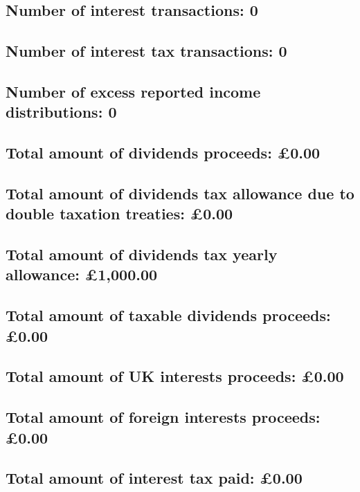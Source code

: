 \documentclass{article}
\begin{document}
\subsection*{Number of interest transactions: 0}
\subsection*{Number of interest tax transactions: 0}
\subsection*{Number of excess reported income distributions: 0}
\subsection*{Total amount of dividends proceeds: £0.00}
\subsection*{Total amount of dividends tax allowance due to double taxation treaties: £0.00}
\subsection*{Total amount of dividends tax yearly allowance: £1,000.00}
\subsection*{Total amount of taxable dividends proceeds: £0.00}
\subsection*{Total amount of UK interests proceeds: £0.00}
\subsection*{Total amount of foreign interests proceeds: £0.00}
\subsection*{Total amount of interest tax paid: £0.00}
\end{document}
